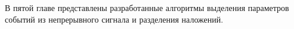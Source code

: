 \documentclass[a4paper,14pt]{extreport}
\begin{document}
В пятой главе представлены разработанные алгоритмы выделения параметров событий из непрерывного сигнала и разделения наложений.




\end{document}

